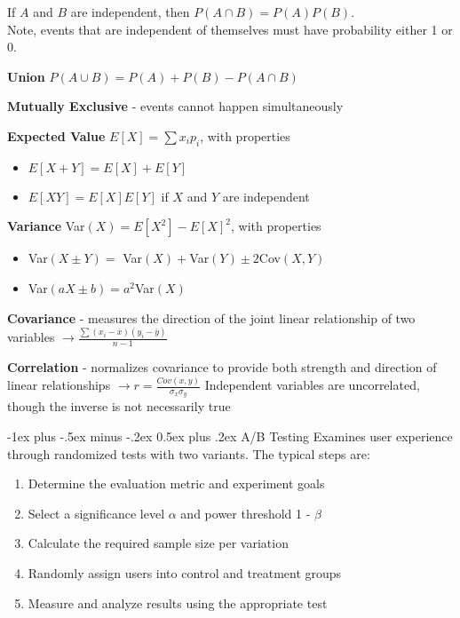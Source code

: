 \documentclass[10pt,landscape]{article}
\makeatletter
\renewcommand{\section}{\@startsection{section}{1}{0mm}%
                                {-1ex plus -.5ex minus -.2ex}%
                                {0.5ex plus .2ex}%
                                {\normalfont\large\bfseries}}
\makeatother
\begin{document}
\begin{multicols}{3}
If $A$ and $B$ are independent, then $P(A \cap B) = P(A) P(B)$.\\
Note, events that are independent of themselves must have
probability either 1 or 0.


\textbf{Union} $P(A \cup B) = P(A) + P(B) - P(A \cap B) $

\textbf{Mutually Exclusive} - events cannot happen simultaneously
\smallskip

\textbf{Expected Value} $E[X] = \sum x_i p_i$, with properties
    \begin{itemize}[label={--},leftmargin=4mm]
    \itemsep -.4mm
    \item $E[X + Y] = E[X] + E[Y]$
    \item $E[XY] = E[X]E[Y]$ if $X$ and $Y$ are independent
    \end{itemize}

\textbf{Variance} Var$(X) = E[X^2] - E[X]^2$, with properties
    \begin{itemize}[label={--},leftmargin=4mm]
    \itemsep -.4mm
    \item Var$(X\pm Y) =$ Var$(X) +$Var$(Y) \pm 2$Cov$(X,Y)$
    \item Var$(aX \pm b) = a^2$Var$(X)$
    \end{itemize}

\textbf{Covariance} - measures the direction of the joint linear relationship of two variables
$\to \frac{\sum (x_i - \bar{x}) (y_i - \bar{y})}{n-1} $

\textbf{Correlation} - normalizes covariance to provide both strength and direction of linear relationships $\to r =  \frac{Cov(x,y)}{\sigma_x \sigma_y}$
Independent variables are uncorrelated,  though the inverse is not necessarily true

\newcommand*{\Perm}[2]{{}^{#1}\!P_{#2}}%
\newcommand*{\Comb}[2]{{}^{#1}C_{#2}}%
\smallskip

\section{A/B Testing}
Examines user experience through randomized tests with two variants.
The typical steps are:
\begin{enumerate}[leftmargin=5mm]
    \itemsep -.4mm
    \item Determine the evaluation metric and experiment goals
    \item Select a significance level $\alpha$ and power threshold 1 - $\beta$
    \item Calculate the required sample size per variation
    \item Randomly assign users into control and treatment groups
    \item Measure and analyze results using the appropriate test
\end{enumerate}


\end{multicols}
\end{document}
